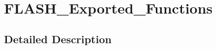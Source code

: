 \hypertarget{group___f_l_a_s_h___exported___functions}{}\section{F\+L\+A\+S\+H\+\_\+\+Exported\+\_\+\+Functions}
\label{group___f_l_a_s_h___exported___functions}


\subsection{Detailed Description}
